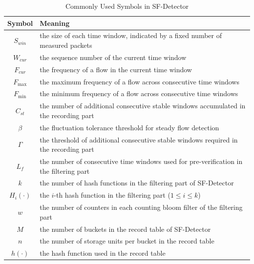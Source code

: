 \documentclass[preprint,12pt]{elsarticle}
\begin{document}
\begin{table}[htbp]
\caption{Commonly Used Symbols in SF-Detector}
\begin{center}
\small
\setlength{\tabcolsep}{5pt}
\begin{tabular}{c>{\raggedright\arraybackslash}p{5.8cm}}
\toprule
\textbf{Symbol} & \textbf{Meaning} \\
\midrule
$S_{win}$ & the size of each time window, indicated by a fixed number of measured packets \\
$W_{cur}$ & the sequence number of the current time window \\
$F_{cur}$ & the frequency of a flow in the current time window \\
$F_{\max}$ & the maximum frequency of a flow across consecutive time windows \\
$F_{\min}$ & the minimum frequency of a flow across consecutive time windows \\
$C_{st}$ & the number of additional consecutive stable windows accumulated in the recording part \\
$\beta$ & the fluctuation tolerance threshold for steady flow detection \\
$\Gamma$ & the threshold of additional consecutive stable windows required in the recording part \\
$L_f$ & the number of consecutive time windows used for pre-verification in the filtering part \\
$k$ & the number of hash functions in the filtering part of SF-Detector \\
$H_i(\cdot)$ & the $i$-th hash function in the filtering part ($1 \le i \le k$) \\
$w$ & the number of counters in each counting bloom filter of the filtering part \\
$M$ & the number of buckets in the record table of SF-Detector \\
$n$ & the number of storage units per bucket in the record table \\
$h(\cdot)$ & the hash function used in the record table \\
\bottomrule
\end{tabular}
\label{tab:symbols}
\end{center}
\end{table}
\end{document}
